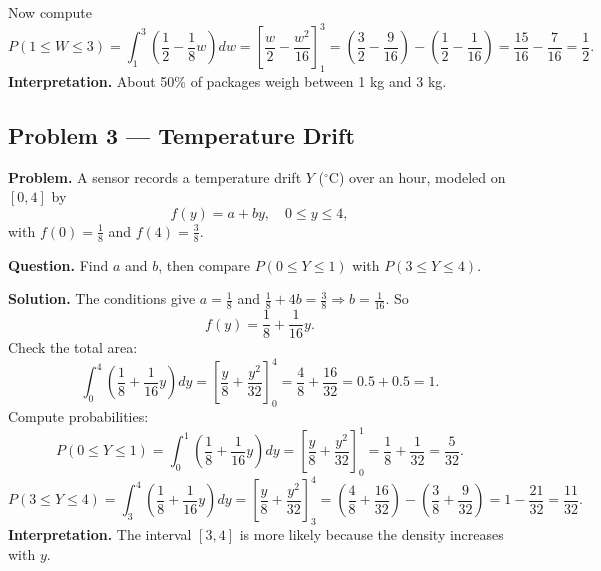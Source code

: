 \begin{ExamProblems}
		Now compute
		\[
		P(1\le W\le 3)=\int_1^3 \left(\frac{1}{2}-\frac{1}{8}w\right)dw
		=\left[\frac{w}{2}-\frac{w^2}{16}\right]_1^3
		=\left(\frac{3}{2}-\frac{9}{16}\right)-\left(\frac{1}{2}-\frac{1}{16}\right)
		=\frac{15}{16}-\frac{7}{16}=\frac{1}{2}.
		\]
		\textbf{Interpretation.} About 50\% of packages weigh between 1 kg and 3 kg.
		
		
		\hypertarget{c3-ex3}{}
		\item
		\subsection*{Problem 3 — Temperature Drift}
		
		\textbf{Problem.}
		A sensor records a temperature drift \(Y\) (\(^\circ\)C) over an hour, modeled on \([0,4]\) by
		\[
		f(y)=a+by,\quad 0\le y\le 4,
		\]
		with \(f(0)=\frac{1}{8}\) and \(f(4)=\frac{3}{8}\).
		
		\textbf{Question.} Find \(a\) and \(b\), then compare \(P(0\le Y\le 1)\) with \(P(3\le Y\le 4)\).
		
		\textbf{Solution.}
		The conditions give \(a=\frac{1}{8}\) and \(\frac{1}{8}+4b=\frac{3}{8}\Rightarrow b=\frac{1}{16}\).
		So
		\[
		f(y)=\frac{1}{8}+\frac{1}{16}y.
		\]
		Check the total area:
		\[
		\int_0^4 \left(\frac{1}{8}+\frac{1}{16}y\right)dy
		=\left[\frac{y}{8}+\frac{y^2}{32}\right]_0^4=\frac{4}{8}+\frac{16}{32}=0.5+0.5=1.
		\]
		Compute probabilities:
		\[
		P(0\le Y\le 1)=\int_0^1 \left(\frac{1}{8}+\frac{1}{16}y\right)dy
		=\left[\frac{y}{8}+\frac{y^2}{32}\right]_0^1=\frac{1}{8}+\frac{1}{32}=\frac{5}{32}.
		\]
		\[
		P(3\le Y\le 4)=\int_3^4 \left(\frac{1}{8}+\frac{1}{16}y\right)dy
		=\left[\frac{y}{8}+\frac{y^2}{32}\right]_3^4
		=\left(\frac{4}{8}+\frac{16}{32}\right)-\left(\frac{3}{8}+\frac{9}{32}\right)
		=1-\frac{21}{32}=\frac{11}{32}.
		\]
		\textbf{Interpretation.} The interval \([3,4]\) is more likely because the density increases with \(y\).
		
	\end{ExamProblems}
	
	
